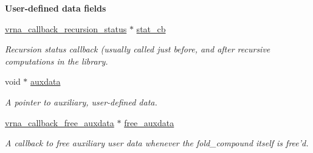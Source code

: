 \begin{Indent}{\bf User-\/defined data fields}\par
\begin{DoxyCompactItemize}
\item 
\hyperlink{group__fold__compound_ga9fafb3f0217e27339bb9faf61a03e723}{vrna\-\_\-callback\-\_\-recursion\-\_\-status} $\ast$ \hyperlink{group__fold__compound_a87a83f6795b569000efcbe65acc3dd81}{stat\-\_\-cb}
\begin{DoxyCompactList}\small\item\em Recursion status callback (usually called just before, and after recursive computations in the library. \end{DoxyCompactList}\item 
void $\ast$ \hyperlink{group__fold__compound_a20048e0c369e9f24b55423d600037c68}{auxdata}
\begin{DoxyCompactList}\small\item\em A pointer to auxiliary, user-\/defined data. \end{DoxyCompactList}\item 
\hyperlink{group__fold__compound_ga75aaf7b809290de808e545877a9e20f7}{vrna\-\_\-callback\-\_\-free\-\_\-auxdata} $\ast$ \hyperlink{group__fold__compound_a8e84dbabab016ecd74da6c38cb94e816}{free\-\_\-auxdata}
\begin{DoxyCompactList}\small\item\em A callback to free auxiliary user data whenever the fold\-\_\-compound itself is free'd. \end{DoxyCompactList}\end{DoxyCompactItemize}
\end{Indent}
